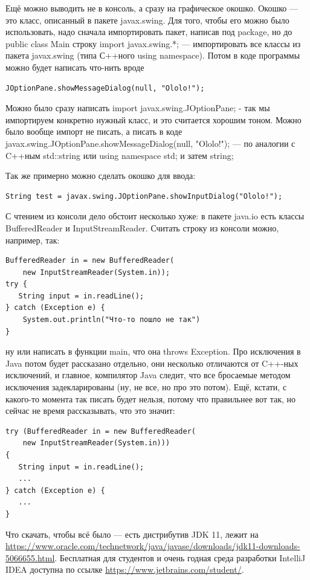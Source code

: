 \documentclass[a5paper]{article}
\begin{document}
Ещё можно выводить не в консоль, а сразу на графическое окошко. Окошко --- это класс, описанный в пакете javax.swing. Для того, чтобы его можно было использовать, надо сначала импортировать пакет, написав под package, но до public class Main строку import javax.swing.*; --- импортировать все классы из пакета javax.swing (типа С++ного using namespace). Потом в коде программы можно будет написать что-нить вроде

\begin{verbatim}
JOptionPane.showMessageDialog(null, "Ololo!");
\end{verbatim}

Можно было сразу написать import javax.swing.JOptionPane; - так мы импортируем конкретно нужный класс, и это считается хорошим тоном. Можно было вообще импорт не писать, а писать в коде javax.swing.JOptionPane.showMessageDialog(null, "Ololo!");  --- по аналогии с C++ным std::string или using namespace std; и затем string;

Так же примерно можно сделать окошко для ввода:

\begin{verbatim}
String test = javax.swing.JOptionPane.showInputDialog("Ololo!");
\end{verbatim}

С чтением из консоли дело обстоит несколько хуже: в пакете java.io есть классы BufferedReader и InputStreamReader. Считать строку из консоли можно, например, так:

\begin{verbatim}
BufferedReader in = new BufferedReader(
    new InputStreamReader(System.in));
try {
   String input = in.readLine();
} catch (Exception e) {
    System.out.println("Что-то пошло не так")
}
\end{verbatim}

ну или написать в функции main, что она throws Exception. Про исключения в Java потом будет рассказано отдельно, они несколько отличаются от C++-ных исключений, и главное, компилятор Java следит, что все бросаемые методом исключения задекларированы (ну, не все, но про это потом). Ещё, кстати, с какого-то момента так писать будет нельзя, потому что правильнее вот так, но сейчас не время рассказывать, что это значит:

\begin{verbatim}
try (BufferedReader in = new BufferedReader(
    new InputStreamReader(System.in))) 
{
   String input = in.readLine();
   ...
} catch (Exception e) {
   ...
}
\end{verbatim}

Что скачать, чтобы всё было --- есть дистрибутив JDK 11, лежит на \url{https://www.oracle.com/technetwork/java/javase/downloads/jdk11-downloads-5066655.html}. Бесплатная для студентов и очень годная среда разработки IntelliJ IDEA доступна по ссылке \url{https://www.jetbrains.com/student/}. 
\end{document}
